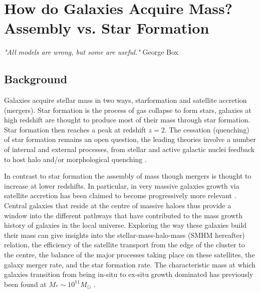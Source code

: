 

\chapter{How do Galaxies Acquire Mass? Assembly vs. Star Formation} %
\label{Chapter:GalGrowth}
\begin{center}
    \textit{"All models are wrong, but some are useful."}
    George Box
\end{center}

\section{Background}
Galaxies acquire stellar mass in two ways, starformation and satellite accretion (mergers). Star formation is the process of gas collapse to form stars, galaxies at high redshift are thought to produce most of their mass through star formation. Star formation then reaches a peak at redshift $z=2$. The cessation (quenching) of star formation remains an open question, the leading theories involve a number of internal and external processes, from stellar and active galactic nuclei feedback to host halo and/or morphological quenching \citep{Granato2004AHosts, Dekel2009ColdFormation, Lilly2013GASHALOS, Schawinski2014TheGalaxies}. 

In contrast to star formation the assembly of mass though mergers is thought to increase at lower redshifts. In particular, in very massive galaxies growth via satellite accretion has been claimed to become progressively more relevant \citep{DeLucia2006TheGalaxies,vanDokkum2010THE2, Shankar2013SizeUniverse, Shankar2015, Buchan2016, Groenewald2017TheGrowth, Matharu2019HST/WFC3Mergers}. Central galaxies that reside at the centre of massive haloes thus provide a window into the different pathways that have contributed to the mass growth history of galaxies in the local universe. Exploring the way these galaxies build their mass can give insights into the stellar-mass-halo-mass (SMHM hereafter) relation, the efficiency of the satellite transport from the edge of the cluster to the centre, the balance of the major processes taking place on these satellites, the galaxy merger rate, and the star formation rate. The characteristic mass at which galaxies transition from being in-situ to ex-situ growth dominated has previously been found at $M_* \sim 10^{11} M_{\odot}$ \citep{Cattaneo2011HowMass, Bernardi2011EvidenceRelations, Shankar2013SizeUniverse}. 


